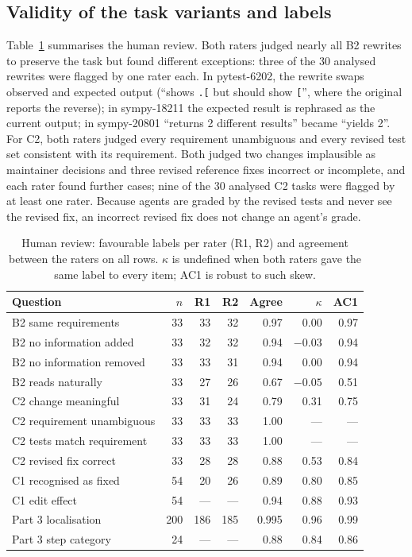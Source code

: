 \documentclass[conference]{IEEEtran}
\begin{document}
\subsection{Validity of the task variants and labels}
\label{sec:human}
Table~\ref{tab:human} summarises the human review. Both raters judged nearly all B2 rewrites to preserve the task but found different exceptions: three of the 30 analysed rewrites were flagged by one rater each. In pytest-6202, the rewrite swaps observed and expected output (``shows \texttt{.[} but should show \texttt{[}'', where the original reports the reverse); in sympy-18211 the expected result is rephrased as the current output; in sympy-20801 ``returns 2 different results'' became ``yields 2''. For C2, both raters judged every requirement unambiguous and every revised test set consistent with its requirement. Both judged two changes implausible as maintainer decisions and three revised reference fixes incorrect or incomplete, and each rater found further cases; nine of the 30 analysed C2 tasks were flagged by at least one rater. Because agents are graded by the revised tests and never see the revised fix, an incorrect revised fix does not change an agent's grade.

\begin{table}[t]
\centering
\caption{Human review: favourable labels per rater (R1, R2) and agreement between the raters on all rows. $\kappa$ is undefined when both raters gave the same label to every item; AC1 is robust to such skew.}
\label{tab:human}
\footnotesize
\setlength{\tabcolsep}{3pt}
\begin{tabular}{lrrrrrr}
\toprule
Question & $n$ & R1 & R2 & Agree & $\kappa$ & AC1\\
\midrule
B2 same requirements & 33 & 33 & 32 & 0.97 & 0.00 & 0.97\\
B2 no information added & 33 & 32 & 32 & 0.94 & $-0.03$ & 0.94\\
B2 no information removed & 33 & 33 & 31 & 0.94 & 0.00 & 0.94\\
B2 reads naturally & 33 & 27 & 26 & 0.67 & $-0.05$ & 0.51\\
C2 change meaningful & 33 & 31 & 24 & 0.79 & 0.31 & 0.75\\
C2 requirement unambiguous & 33 & 33 & 33 & 1.00 & --- & ---\\
C2 tests match requirement & 33 & 33 & 33 & 1.00 & --- & ---\\
C2 revised fix correct & 33 & 28 & 28 & 0.88 & 0.53 & 0.84\\
C1 recognised as fixed & 54 & 20 & 26 & 0.89 & 0.80 & 0.85\\
C1 edit effect & 54 & --- & --- & 0.94 & 0.88 & 0.93\\
Part 3 localisation & 200 & 186 & 185 & 0.995 & 0.96 & 0.99\\
Part 3 step category & 24 & --- & --- & 0.88 & 0.84 & 0.86\\
\bottomrule
\end{tabular}
\end{table}
\end{document}
